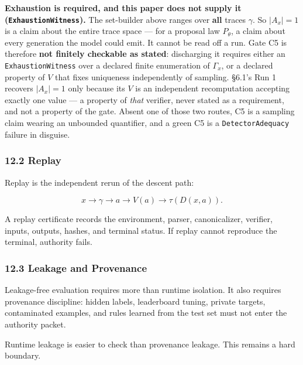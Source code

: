 \documentclass[
  10pt,
]{article}
\DeclareRobustCommand{\texttt}[1]{{\paperSymbolFont\nolinkurl{#1}}}
\begin{document}
\textbf{Exhaustion is required, and this paper does not supply it (\texttt{ExhaustionWitness}).} The set-builder above ranges over \textbf{all} traces \protect\hypertarget{math-E0021-0201}{}{\(\gamma\)}. So \protect\hypertarget{math-E0150-0202}{}{\(|A_x| = 1\)} is a claim about the entire trace space --- for a proposal law \protect\hypertarget{math-E0128-0203}{}{\(P_\theta\)}, a claim about every generation the model could emit. It cannot be read off a run. Gate C5 is therefore \textbf{not finitely checkable as stated}: discharging it requires either an \texttt{ExhaustionWitness} over a declared finite enumeration of \protect\hypertarget{math-E0153-0204}{}{\(\Gamma_x\)}, or a declared property of \protect\hypertarget{math-E0012-0205}{}{\(V\)} that fixes uniqueness independently of sampling. §6.1's Run 1 recovers \protect\hypertarget{math-E0150-0206}{}{\(|A_x| = 1\)} only because its \protect\hypertarget{math-E0012-0207}{}{\(V\)} is an independent recomputation accepting exactly one value --- a property of \emph{that} verifier, never stated as a requirement, and not a property of the gate. Absent one of those two routes, C5 is a sampling claim wearing an unbounded quantifier, and a green C5 is a \texttt{DetectorAdequacy} failure in disguise.

\subsubsection{12.2 Replay}\label{replay}

Replay is the independent rerun of the descent path:

\protect\hypertarget{math-E0154-0208}{}{\[
x\to\gamma\to a\to V(a)\to\tau(D(x,a)).
\]}

A replay certificate records the environment, parser, canonicalizer, verifier, inputs, outputs, hashes, and terminal status. If replay cannot reproduce the terminal, authority fails.

\subsubsection{12.3 Leakage and Provenance}\label{leakage-and-provenance}

Leakage-free evaluation requires more than runtime isolation. It also requires provenance discipline: hidden labels, leaderboard tuning, private targets, contaminated examples, and rules learned from the test set must not enter the authority packet.

Runtime leakage is easier to check than provenance leakage. This remains a hard boundary.
\end{document}
